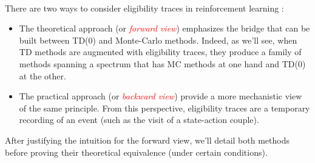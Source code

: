 \documentclass[a4paper]{article}
\begin{document}
	
		
	\vhrulefill{2pt}
	
	\tableofcontents
	
	\vhrulefill{2pt}
	
	
	\paragraph{} There are two ways to consider eligibility traces in reinforcement learning : 
	\begin{itemize}
		\item The theoretical approach (or \textcolor{red}{\emph{forward view}}) emphasizes the bridge that can be built between TD(0) and Monte-Carlo methods. Indeed, as we'll see, when TD methods are augmented with eligibility traces, they produce a family of methods spanning a spectrum that has MC methods at one hand and TD(0) at the other. 
		\item The practical approach (or \emph{\textcolor{red}{backward view}}) provide a more mechanistic view of the same principle. From this perspective, eligibility traces are a temporary recording of an event (such as the visit of a state-action couple). 
	\end{itemize}
	After justifying the intuition for the forward view, we'll detail both methods before proving their theoretical equivalence (under certain conditions). 
	
\end{document}
